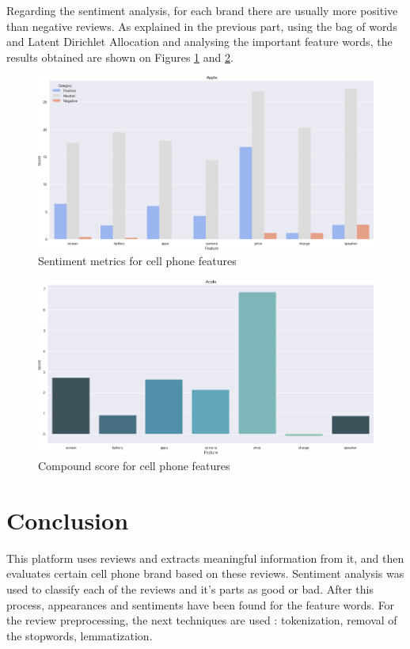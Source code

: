 \documentclass[11pt]{article}
\begin{document}
  Regarding the sentiment analysis, for each brand there are usually more positive than negative reviews. As explained in the previous part, using the bag of words and Latent Dirichlet Allocation and analysing the important feature words, the results obtained are shown on Figures \ref{fig:appleMetrics} and \ref{fig:appleCompound}.
  
  \begin{figure}[h!]
    \centering
      \includegraphics[width=\linewidth]{Apple_composition.png}
    \caption{Sentiment metrics for cell phone features}
    \label{fig:appleMetrics}
  \end{figure}
  
  \begin{figure}[h!]
    \centering
      \includegraphics[width=\linewidth]{Apple_compound.png}
    \caption{Compound score for cell phone features}
    \label{fig:appleCompound}
  \end{figure}
  
  \section{Conclusion}
  This platform uses reviews and extracts meaningful information from it, and then evaluates certain cell phone brand based on these reviews. Sentiment analysis was used to classify each of the reviews and it's parts as good or bad. After this process, appearances and sentiments have been found for the feature words. For the review preprocessing, the next techniques are used : tokenization, removal of the stopwords, lemmatization. \par
  
\end{document}
